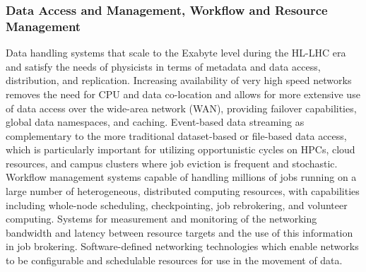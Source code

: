 \begin{frame}
\frametitle{Data Access and Management, Workflow and
Resource Management}
\scriptsize{ 
Data handling systems that scale to the Exabyte level during the
HL-LHC era and satisfy the needs of physicists in terms of metadata
and data access, distribution, and replication. Increasing
availability of very high speed networks removes the need for CPU
and data co-location and allows for more extensive use of data
access over the wide-area network (WAN), providing failover
capabilities, global data namespaces, and caching. Event-based data
streaming as complementary to the more traditional dataset-based or
file-based data access, which is particularly important for
utilizing opportunistic cycles on HPCs, cloud resources, and campus
clusters where job eviction is frequent and stochastic. Workflow
management systems capable of handling millions of jobs running on a
large number of heterogeneous, distributed computing resources, with
capabilities including whole-node scheduling, checkpointing, job
rebrokering, and volunteer computing. Systems for measurement and
monitoring of the networking bandwidth and latency between resource
targets and the use of this information in job
brokering. Software-defined networking technologies which enable
networks to be configurable and schedulable resources for use in the
movement of data.
}

\end{frame}


